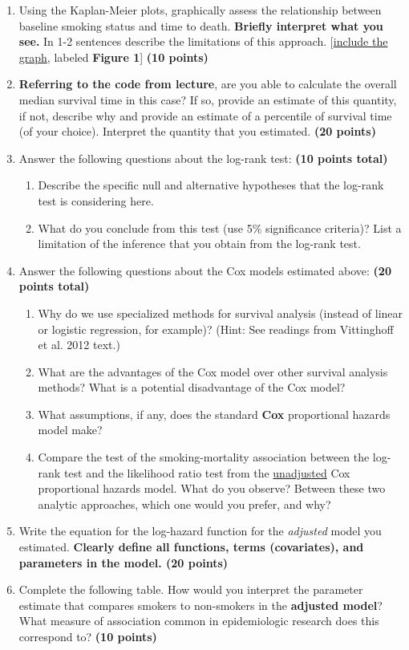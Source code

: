 \documentclass{article}\usepackage[]{graphicx}\usepackage[]{color}
\begin{document}
\begin{enumerate}
  \item Using the Kaplan-Meier plots, graphically assess the relationship between baseline smoking status and time to death. \textbf{Briefly interpret what you see.} In 1-2 sentences describe the limitations of this approach. [{\ul{include the graph}}, labeled \textbf{Figure 1}] \textbf{(10 points)}
  \item \textbf{Referring to the code from lecture}, are you able to calculate the overall median survival time in this case? If so, provide an estimate of this quantity, if not, describe why and provide an estimate of a percentile of survival time (of your choice). Interpret the quantity that you estimated. \textbf{(20 points)}
  \item Answer the following questions about the log-rank test: \textbf{(10 points total)}
  \begin{enumerate}
    \item Describe the specific null and alternative hypotheses that the log-rank test is considering here.
    \item What do you conclude from this test (use 5\% significance criteria)? List a limitation of the inference that you obtain from the log-rank test.
  \end{enumerate}
\item Answer the following questions about the Cox models estimated above: \textbf{(20 points total)}
  \begin{enumerate}
    \item Why do we use specialized methods for survival analysis (instead of linear or logistic regression, for example)? (Hint: See readings from Vittinghoff et al. 2012 text.)
    \item What are the advantages of the Cox model over other survival analysis methods? What is a potential disadvantage of the Cox model?
    \item What assumptions, if any, does the standard \textbf{Cox} proportional hazards model make?
    \item Compare the test of the smoking-mortality association between the log-rank test and the likelihood ratio test from the \ul{unadjusted} Cox proportional hazards model. What do you observe? Between these two analytic approaches, which one would you prefer, and why?
  \end{enumerate}
  \item Write the equation for the log-hazard function for the \textit{adjusted} model you estimated. \textbf{Clearly define all functions, terms (covariates), and parameters in the model. (20 points)}
  \item Complete the following table. How would you interpret the parameter estimate that compares smokers to non-smokers in the \textbf{adjusted model}? What measure of association common in epidemiologic research does this correspond to? \textbf{(10 points)}




\end{enumerate}
\end{document}
